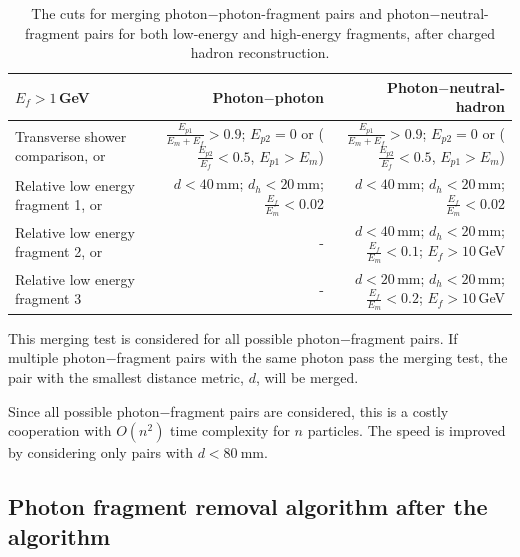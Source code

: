 \begin{table}[htbp]
\begin{tabular}{l  r  r }
\hline
$E_f>1$\,GeV &  Photon$-$photon & Photon$-$neutral-hadron \\
\hline
\multicolumn{1}{L{0.3\textwidth}}{Transverse shower comparison, or} & \multicolumn{1}{R{0.3\textwidth}}{$\frac{E_{p1}}{E_m + E_f} > 0.9 $; $E_{p2} = 0$ or ($\frac{E_{p2}}{E_f} < 0.5 $, $E_{p1} > E_m$)}  & \multicolumn{1}{R{0.3\textwidth}}{$\frac{E_{p1}}{E_m + E_f} > 0.9 $; $E_{p2} = 0$ or ($\frac{E_{p2}}{E_f} < 0.5 $, $E_{p1} > E_m$)} \\
\multicolumn{1}{L{0.3\textwidth}}{Relative low energy fragment 1, or} & \multicolumn{1}{R{0.3\textwidth}}{$d < 40$\,mm; $d_h < 20$\,mm; $\frac{E_f}{E_m} < 0.02$} & \multicolumn{1}{R{0.3\textwidth}}{$d < 40$\,mm; $d_h < 20$\,mm; $\frac{E_f}{E_m} < 0.02$} \\
\multicolumn{1}{L{0.3\textwidth}}{Relative low energy fragment 2, or} & \multicolumn{1}{R{0.3\textwidth}}{-}  & \multicolumn{1}{R{0.3\textwidth}}{$d < 40$\,mm; $d_h < 20$\,mm; $\frac{E_f}{E_m} < 0.1$; $E_f > 10$\,GeV} \\
\multicolumn{1}{L{0.3\textwidth}}{Relative low energy fragment 3} & \multicolumn{1}{R{0.3\textwidth}}{-}  & \multicolumn{1}{R{0.3\textwidth}}{$d < 20$\,mm; $d_h < 20$\,mm; $\frac{E_f}{E_m} < 0.2$; $E_f > 10$\,GeV} \\
\hline
\hline
\end{tabular}

\caption[The cuts for photon fragment removal algorithm in the \ECAL.]%
{The cuts for merging photon$-$photon-fragment pairs and photon$-$neutral-fragment pairs for both low-energy and high-energy fragments, after charged hadron reconstruction.}
\label{tab:photonFragRemovalCuts}
\end{table}


This merging test is considered for all possible  photon$-$fragment pairs. If multiple photon$-$fragment pairs with the same photon pass the merging test, the pair with the smallest distance metric, $d$, will be merged.

Since all possible photon$-$fragment pairs are considered, this is a costly cooperation with $O(n^2)$ time complexity for $n$ particles. The speed is improved by considering only pairs with $d<80\ \text{mm}$.




\subsection{Photon fragment removal algorithm after the \PhotonReconstruction algorithm}

